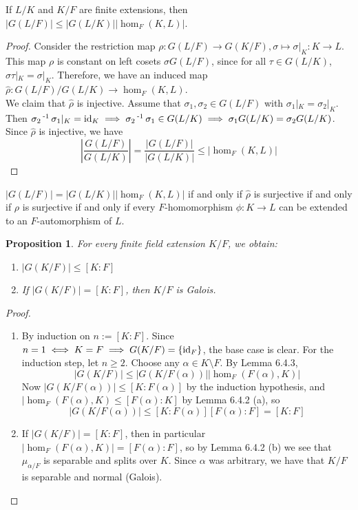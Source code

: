 \documentclass[11pt]{book}
\newcounter{counter}
\newtheorem{proposition}[counter]{Proposition}   \newtheorem{problem}[counter]{Problem}   \newtheorem*{proposition*}{Proposition}   \newtheorem*{lemma*}{Lemma}
\theoremstyle{definition}   \newtheorem{defn}[counter]{Definition} %
\newcommand{\bs}{\setminus}   \newcommand{\A}{\mathcal{A}}   \newcommand{\sy}{\textnormal{Syl}}   \newcommand{\size}[1]{\left| #1 \right|}
\DeclareMathOperator{\ra}{\rightarrow}   \DeclareMathOperator{\Poly}{\mathbf{P}}   \DeclareMathOperator{\spn}{\textnormal{span}}   \DeclareMathOperator{\aut}{\textnormal{Aut}}
\newcommand{\vs}{\vspace{8pt}}   \newcommand{\hs}{\hspace{8pt}}
\numberwithin{counter}{chapter}
\begin{document}
\vs

\begin{lemma}
If $L/K$ and $K/F$ are finite extensions, then $|G(L/F)| \leq |G(L/K)| |\hom_F(K,L)|$. 
\end{lemma}

\begin{proof}
Consider the restriction map $\rho : G(L/F) \ra G(K/F), \sigma \mapsto \sigma|_K : K \ra L$. This map $\rho$ is constant on left cosets $\sigma G(L/F)$, since for all $\tau \in G(L/K)$, $\sigma \tau |_K = \sigma|_K$. Therefore, we have an induced map $\hat{\rho} : G(L/F)/G(L/K) \ra \hom_F(K,L)$. \\

We claim that $\hat{\rho}$ is injective. Assume that $\sigma_1,\sigma_2 \in G(L/F)$ with $\sigma_1|_K = \sigma_2|_K$. Then $\sigma_2\operatorname{^{-1}} \sigma_1 |_K = \textnormal{id}_K \implies \sigma_2\operatorname{^{-1}} \sigma_1 \in G(L/K) \implies \sigma_1 G(L/K) = \sigma_2 G(L/K)$. Since $\hat{\rho}$ is injective, we have
	\[\left| \frac{G(L/F)}{G(L/K)} \right| = \frac{|G(L/F)|}{|G(L/K)|} \leq |\hom_F(K,L)| \]
\end{proof}

\vs

\begin{corollary}
$|G(L/F)| = |G(L/K)| |\hom_F(K,L)|$ if and only if $\hat{\rho}$ is surjective if and only if $\rho$ is surjective if and only if every $F$-homomorphism $\phi : K \ra L$ can be extended to an $F$-automorphism of $L$. 
\end{corollary}

\vs

\begin{proposition}
For every finite field extension $K/F$, we obtain:
\begin{enumerate}
\item[(a)] $|G(K/F)| \leq [K : F]$
\item[(b)] If $|G(K/F)| = [K : F]$, then $K/F$ is Galois. 
\end{enumerate}
\end{proposition}

\begin{proof}\ 
\begin{enumerate}
\item[(a)] By induction on $n := [K : F]$. Since $n = 1 \iff K = F \implies G(K/F) = \{\textnormal{id}_F\}$, the base case is clear. For the induction step, let $n \geq 2$. Choose any $\alpha \in K \bs F$. By Lemma 6.4.3,
	\[|G(K/F)| \leq |G(K/F(\alpha))| |\hom_F(F(\alpha),K)| \]
Now $|G(K/F(\alpha))| \leq [K : F(\alpha)]$ by the induction hypothesis, and $|\hom_F(F(\alpha),K) \leq [F(\alpha) : K]$ by Lemma 6.4.2 (a), so
	\[|G(K/F(\alpha))| \leq [K : F(\alpha)] [F(\alpha) : F] = [K : F] \]

\item[(b)] If $|G(K/F)| = [K : F]$, then in particular $|\hom_F(F(\alpha),K)| = [F(\alpha) : F]$, so by Lemma 6.4.2 (b) we see that $\mu_{\alpha/F}$ is separable and splits over $K$. Since $\alpha$ was arbitrary, we have that $K/F$ is separable and normal (Galois). 
\end{enumerate}
\end{proof}
\end{document}
